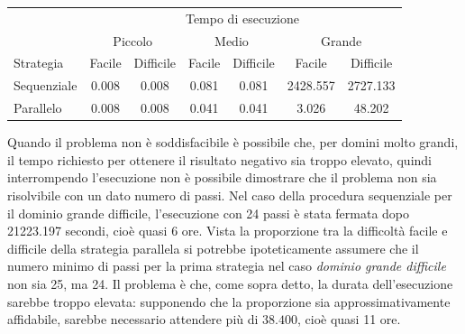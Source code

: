 \documentclass[a4paper,oneside,12pt]{book}
\begin{document}
    \begin{center}
        \begin{tabular}{l c c c c c c}
            \toprule %
            &\multicolumn{6}{c}{Tempo di esecuzione} \\
            \cmidrule(l){2-7}
            & \multicolumn{2}{c}{Piccolo} & \multicolumn{2}{c}{Medio} & \multicolumn{2}{c}{Grande} \\
            \cmidrule(l){2-7}
            Strategia & Facile & Difficile & Facile & Difficile & Facile & Difficile\\
            \midrule
            Sequenziale & 0.008 & 0.008 & 0.081 & 0.081 & 2428.557  & 2727.133 \\ %
            Parallelo   & 0.008 & 0.008 & 0.041 & 0.041 & 3.026     & 48.202\\ %

            \bottomrule
        \end{tabular}
    \end{center}
    Quando il problema non è soddisfacibile è possibile che, per domini molto grandi, il tempo richiesto
    per ottenere il risultato negativo sia troppo elevato, quindi interrompendo l'esecuzione non è possibile dimostrare
    che il problema non sia risolvibile con un dato numero di passi.
    Nel caso della procedura sequenziale per il dominio grande difficile, l'esecuzione con 24 passi è stata fermata
    dopo 21223.197 secondi, cioè quasi 6 ore.
    Vista la proporzione tra la difficoltà facile e difficile della strategia parallela si potrebbe ipoteticamente
    assumere che il numero minimo di passi per la prima strategia nel caso \textit{dominio grande difficile} non sia 25,
    ma 24.
    Il problema è che, come sopra detto, la durata dell'esecuzione sarebbe troppo elevata: supponendo che la proporzione
    sia approssimativamente affidabile, sarebbe necessario attendere più di $38.400$, cioè quasi 11 ore.
\newpage
\end{document}
